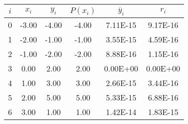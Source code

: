 \documentclass{report}[10pts]
\begin{document}
\begin{center}\begin{tabular}{|c|c|c|c|c|c|}
   \hline
   $i$ & $x_i$ & $y_i$ & $P(x_i)$ & $\overline{y}_i$ & $r_i$\\
   \hline
   0 & -3.00 & -4.00 & -4.00 & 7.11E-15 & 9.17E-16\\
   \hline
   1 & -2.00 & -1.00 & -1.00 & 3.55E-15 & 4.59E-16\\
   \hline
   2 & -1.00 & -2.00 & -2.00 & 8.88E-16 & 1.15E-16\\
   \hline
   3 & 0.00 & 2.00 & 2.00 & 0.00E+00 & 0.00E+00\\
   \hline
   4 & 1.00 & 3.00 & 3.00 & 2.66E-15 & 3.44E-16\\
   \hline
   5 & 2.00 & 5.00 & 5.00 & 5.33E-15 & 6.88E-16\\
   \hline
   6 & 3.00 & 1.00 & 1.00 & 1.42E-14 & 1.83E-15\\
   \hline
\end{tabular}\end{center}
\end{document}

